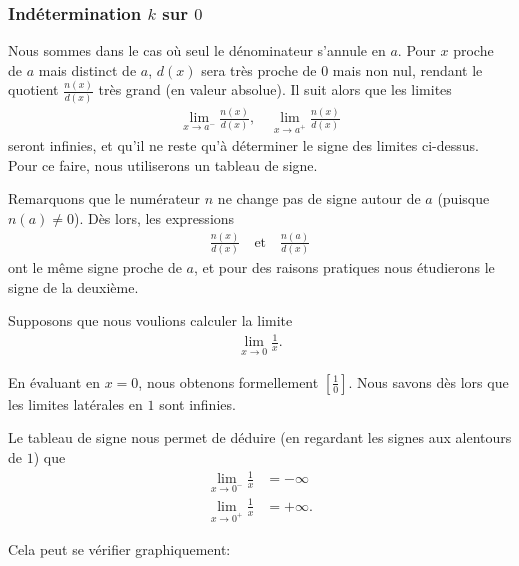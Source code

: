 \documentclass[main.tex]{subfiles}
\begin{document}
\subsubsection{Indétermination $k$ sur $0$}

Nous sommes dans le cas où seul le dénominateur s'annule en $a$.
Pour $x$ proche de $a$ mais distinct de $a$,
$d(x)$ sera très proche de $0$ mais non nul,
rendant le quotient $\frac {n(x)} {d(x)}$ très grand (en valeur absolue).
Il suit alors que les limites
\begin{align}
    \lim_{x \to a^-} \frac {n(x)} {d(x)},
    \quad
    \lim_{x \to a^+} \frac {n(x)} {d(x)}
\end{align}
seront infinies,
et qu'il ne reste qu'à déterminer le signe des limites ci-dessus.
Pour ce faire,
nous utiliserons un tableau de signe.

Remarquons que le numérateur $n$ ne change pas de signe autour de $a$ (puisque $n(a) \neq 0$).
Dès lors,
les expressions
\begin{align}
    \frac {n(x)} {d(x)}
    \quad \text{et} \quad
    \frac {n(a)} {d(x)}
\end{align}
ont le même signe proche de $a$,
et pour des raisons pratiques nous étudierons le signe de la deuxième.

\begin{example}

    Supposons que nous voulions calculer la limite
    \begin{align}
        \lim_{x \to 0} \frac 1 x.
    \end{align}

    En évaluant en $x = 0$,
    nous obtenons formellement $\left[\frac {1} {0}\right]$.
    Nous savons dès lors que les limites latérales en $1$ sont infinies.

    Le tableau de signe
    nous permet de déduire (en regardant les signes aux alentours de $1$) que
    \begin{align}
        \lim_{x \to 0^-} \frac 1 x &= -\infty\\
        \lim_{x \to 0^+} \frac 1 x &= +\infty.
    \end{align}

    Cela peut se vérifier graphiquement:
    \begin{center}
        \begin{plot}{0.25}{-12}{-12}{12}{12}
        \end{plot}
    \end{center}
\end{example}
\end{document}
